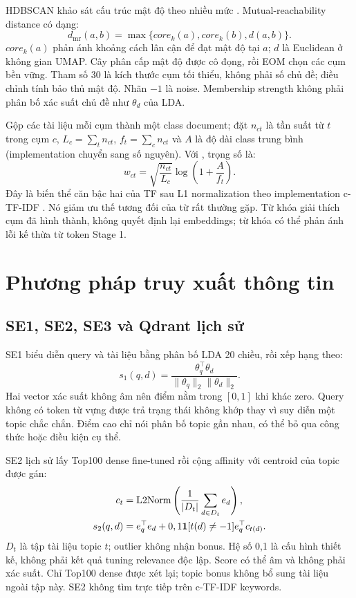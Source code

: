 HDBSCAN khảo sát cấu trúc mật độ theo nhiều mức \cite{hdbscan}. Mutual-reachability distance có dạng:
\begin{equation}\label{eq:hdbscan}
d_{\mathrm{mr}}(a,b)=\max\{core_k(a),core_k(b),d(a,b)\}.
\end{equation}
$core_k(a)$ phản ánh khoảng cách lân cận để đạt mật độ tại $a$; $d$ là Euclidean ở không gian UMAP. Cây phân cấp mật độ được cô đọng, rồi EOM chọn các cụm bền vững. Tham số 30 là kích thước cụm tối thiểu, không phải số chủ đề;  điều chỉnh tính bảo thủ mật độ. Nhãn $-1$ là noise. Membership strength không phải phân bố xác suất chủ đề như $\theta_d$ của LDA.

Gộp các tài liệu mỗi cụm thành một class document; đặt $n_{ct}$ là tần suất từ $t$ trong cụm $c$, $L_c=\sum_tn_{ct}$, $f_t=\sum_cn_{ct}$ và $A$ là độ dài class trung bình (implementation chuyển sang số nguyên). Với , trọng số là:
\begin{equation}\label{eq:ctfidf}
w_{ct}=\sqrt{\frac{n_{ct}}{L_c}}\log\left(1+\frac{A}{f_t}\right).
\end{equation}
Đây là biến thể căn bậc hai của TF sau L1 normalization theo implementation c-TF-IDF \cite{ctfidf}. Nó giảm ưu thế tương đối của từ rất thường gặp. Từ khóa giải thích cụm đã hình thành, không quyết định lại embeddings; từ khóa có thể phản ánh lỗi kế thừa từ token Stage 1.

\section{Phương pháp truy xuất thông tin}
\subsection{SE1, SE2, SE3 và Qdrant lịch sử}
SE1 biểu diễn query và tài liệu bằng phân bố LDA 20 chiều, rồi xếp hạng theo:
\begin{equation}\label{eq:se1}
s_1(q,d)=\frac{\theta_q^\top\theta_d}{\|\theta_q\|_2\|\theta_d\|_2}.
\end{equation}
Hai vector xác suất không âm nên điểm nằm trong $[0,1]$ khi khác zero. Query không có token từ vựng được trả trạng thái không khớp thay vì suy diễn một topic chắc chắn. Điểm cao chỉ nói phân bố topic gần nhau, có thể bỏ qua công thức hoặc điều kiện cụ thể.

SE2 lịch sử lấy Top100 dense fine-tuned rồi cộng affinity với centroid của topic được gán:
\begin{align}
c_t&=\operatorname{L2Norm}\left(\frac1{|D_t|}\sum_{d\in D_t}e_d\right),\label{eq:centroid}\\
s_2(q,d)&=e_q^\top e_d+0,1\mathbf{1}[t(d)\ne-1]e_q^\top c_{t(d)}.\label{eq:se2}
\end{align}
$D_t$ là tập tài liệu topic $t$; outlier không nhận bonus. Hệ số 0,1 là cấu hình thiết kế, không phải kết quả tuning relevance độc lập. Score có thể âm và không phải xác suất. Chỉ Top100 dense được xét lại; topic bonus không bổ sung tài liệu ngoài tập này. SE2 không tìm trực tiếp trên c-TF-IDF keywords.

